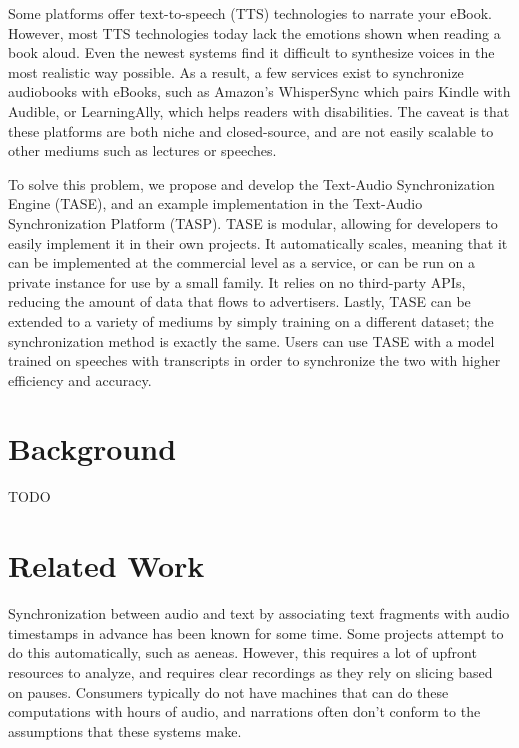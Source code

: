 \documentclass[10pt,twocolumn,letterpaper]{article}
\begin{document}
Some platforms\cite{https://support.google.com/accessibility/android/answer/6283677?hl=en} offer text-to-speech (TTS) technologies to narrate your eBook. However, most TTS technologies today lack the emotions shown when reading a book aloud. Even the newest systems\cite{https://cloud.google.com/text-to-speech/} find it difficult to synthesize voices in the most realistic way possible. As a result, a few services exist to synchronize audiobooks with eBooks, such as Amazon's WhisperSync\cite{} which pairs Kindle\cite{} with Audible\cite{}, or LearningAlly\cite{}, which helps readers with disabilities. The caveat is that these platforms are both niche and closed-source, and are not easily scalable to other mediums such as lectures or speeches.

To solve this problem, we propose and develop the Text-Audio Synchronization Engine (TASE), and an example implementation in the Text-Audio Synchronization Platform (TASP). TASE is modular, allowing for developers to easily implement it in their own projects. It automatically scales, meaning that it can be implemented at the commercial level as a service, or can be run on a private instance for use by a small family. It relies on no third-party APIs, reducing the amount of data that flows to advertisers. Lastly, TASE can be extended to a variety of mediums by simply training on a different dataset; the synchronization method is exactly the same. Users can use TASE with a model trained on speeches with transcripts in order to synchronize the two with higher efficiency and accuracy.

\section{Background}
TODO

\section{Related Work}
Synchronization between audio and text by associating text fragments with audio timestamps in advance has been known for some time. Some projects attempt to do this automatically, such as aeneas\cite{https://www.readbeyond.it/aeneas/}. However, this requires a lot of upfront resources to analyze, and requires clear recordings as they rely on slicing based on pauses. Consumers typically do not have machines that can do these computations with hours of audio, and narrations often don't conform to the assumptions that these systems make.
\end{document}
